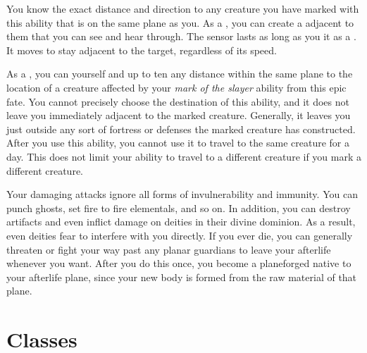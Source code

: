       You know the exact distance and direction to any creature you have marked with this ability that is on the same plane as you.
      As a , you can create a  adjacent to them that you can see and hear through.
      The sensor lasts as long as you  it as a .
      It moves to stay adjacent to the target, regardless of its speed.

       As a , you can  yourself and up to ten  any distance within the same plane to the location of a creature affected by your \textit{mark of the slayer} ability from this epic fate.
      You cannot precisely choose the destination of this ability, and it does not leave you immediately adjacent to the marked creature.
      Generally, it leaves you just outside any sort of fortress or defenses the marked creature has constructed.
      After you use this ability, you cannot use it to travel to the same creature for a day.
      This does not limit your ability to travel to a different creature if you mark a different creature.

      Your damaging attacks ignore all forms of invulnerability and immunity.
      You can punch ghosts, set fire to fire elementals, and so on.
      In addition, you can destroy artifacts and even inflict damage on deities in their divine dominion.
      As a result, even deities fear to interfere with you directly.
      If you ever die, you can generally threaten or fight your way past any planar guardians to leave your afterlife whenever you want.
      After you do this once, you become a planeforged native to your afterlife plane, since your new body is formed from the raw material of that plane.

\section{Classes}
